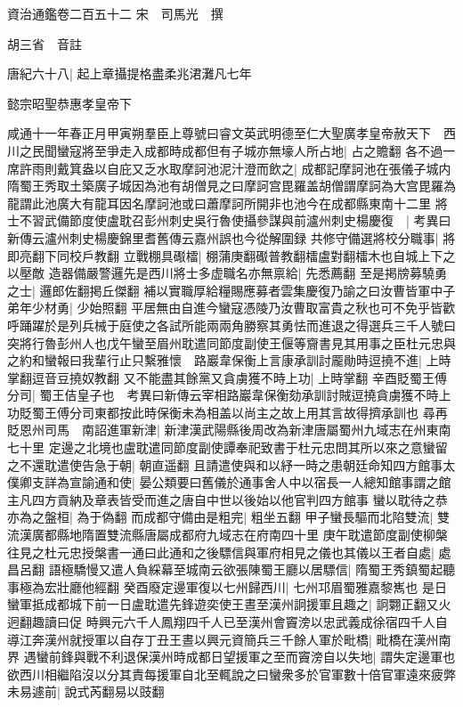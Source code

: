 資治通鑑卷二百五十二
宋　司馬光　撰

胡三省　音註

唐紀六十八|{
	起上章攝提格盡柔兆涒灘凡七年}


懿宗昭聖恭惠孝皇帝下

咸通十一年春正月甲寅朔羣臣上尊號曰睿文英武明德至仁大聖廣孝皇帝赦天下　西川之民聞蠻寇將至爭走入成都時成都但有子城亦無壕人所占地|{
	占之贍翻}
各不過一席許雨則戴箕盎以自庇又乏水取摩訶池泥汁澄而飲之|{
	成都記摩訶池在張儀子城内隋蜀王秀取土築廣子城因為池有胡僧見之曰摩訶宫毘羅盖胡僧謂摩訶為大宫毘羅為龍謂此池廣大有龍耳因名摩訶池或曰蕭摩訶所開非也池今在成都縣東南十二里}
將士不習武備節度使盧耽召彭州刺史吳行魯使攝參謀與前瀘州刺史楊慶復　|{
	考異曰新傳云瀘州刺史楊慶錦里耆舊傳云嘉州誤也今從解圍録}
共修守備選將校分職事|{
	將即亮翻下同校戶教翻}
立戰棚具礟檑|{
	棚蒲庚翻礟普教翻檑盧對翻檑木也自城上下之以壓敵}
造器備嚴警邏先是西川將士多虚職名亦無禀給|{
	先悉薦翻}
至是掲牓募驍勇之士|{
	邏郎佐翻掲丘傑翻}
補以實職厚給糧賜應募者雲集慶復乃諭之曰汝曹皆軍中子弟年少材勇|{
	少始照翻}
平居無由自進今蠻寇憑陵乃汝曹取富貴之秋也可不免乎皆歡呼踊躍於是列兵械于庭使之各試所能兩兩角勝察其勇怯而進退之得選兵三千人號曰突將行魯彭州人也戊午蠻至眉州耽遣同節度副使王偃等齎書見其用事之臣杜元忠與之約和蠻報曰我輩行止只繫雅懷　路巖韋保衡上言康承訓討龎勛時逗撓不進|{
	上時掌翻逗音豆撓奴教翻}
又不能盡其餘黨又貪虜獲不時上功|{
	上時掌翻}
辛酉貶蜀王傅分司|{
	蜀王佶皇子也　考異曰新傳云宰相路巖韋保衡劾承訓討賊逗撓貪虜獲不時上功貶蜀王傅分司東都按此時保衡未為相盖以尚主之故上用其言故得擠承訓也}
尋再貶恩州司馬　南詔進軍新津|{
	新津漢武陽縣後周改為新津唐屬蜀州九域志在州東南七十里}
定邊之北境也盧耽遣同節度副使譚奉祀致書于杜元忠問其所以來之意蠻留之不還耽遣使告急于朝|{
	朝直遥翻}
且請遣使與和以紓一時之患朝廷命知四方館事太僕卿支詳為宣諭通和使|{
	晏公類要曰舊儀於通事舍人中以宿長一人總知館事謂之館主凡四方貢納及章表皆受而進之唐自中世以後始以他官判四方館事}
蠻以耽待之恭亦為之盤桓|{
	為于偽翻}
而成都守備由是粗完|{
	粗坐五翻}
甲子蠻長驅而北陷雙流|{
	雙流漢廣都縣地隋置雙流縣唐屬成都府九域志在府南四十里}
庚午耽遣節度副使柳槃往見之杜元忠授槃書一通曰此通和之後驃信與軍府相見之儀也其儀以王者自處|{
	處昌呂翻}
語極驕慢又遣人負綵幕至城南云欲張陳蜀王廳以居驃信|{
	隋蜀王秀鎮蜀起聽事極為宏壯廳他經翻}
癸酉廢定邊軍復以七州歸西川|{
	七州邛眉蜀雅嘉黎嶲也}
是日蠻軍抵成都城下前一日盧耽遣先鋒遊奕使王晝至漢州詗援軍且趣之|{
	詗翾正翻又火迥翻趣讀曰促}
時興元六千人鳳翔四千人已至漢州會竇滂以忠武義成徐宿四千人自導江奔漢州就授軍以自存丁丑王晝以興元資簡兵三千餘人軍於毗橋|{
	毗橋在漢州南界}
遇蠻前鋒與戰不利退保漢州時成都日望援軍之至而竇滂自以失地|{
	謂失定邊軍也}
欲西川相繼陷沒以分其責每援軍自北至輒說之曰蠻衆多於官軍數十倍官軍遠來疲弊未易遽前|{
	說式芮翻易以豉翻}
